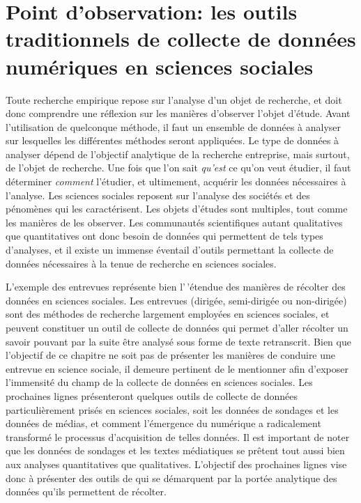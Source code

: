 \documentclass[
  letterpaper,
  DIV=11,
  numbers=noendperiod]{scrreprt}
\begin{document}
\hypertarget{point-dobservation-les-outils-traditionnels-de-collecte-de-donnuxe9es-numuxe9riques-en-sciences-sociales}{%
\section{\texorpdfstring{\textbf{Point d'observation: les outils
traditionnels de collecte de données numériques en sciences
sociales}}{Point d'observation: les outils traditionnels de collecte de données numériques en sciences sociales}}\label{point-dobservation-les-outils-traditionnels-de-collecte-de-donnuxe9es-numuxe9riques-en-sciences-sociales}}

Toute recherche empirique repose sur l'analyse d'un objet de recherche,
et doit donc comprendre une réflexion sur les manières d'observer
l'objet d'étude. Avant l'utilisation de quelconque méthode, il faut un
ensemble de données à analyser sur lesquelles les différentes méthodes
seront appliquées. Le type de données à analyser dépend de l'objectif
analytique de la recherche entreprise, mais surtout, de l'objet de
recherche. Une fois que l'on sait \emph{qu'est} ce qu'on veut étudier,
il faut déterminer \emph{comment} l'étudier, et ultimement, acquérir les
données nécessaires à l'analyse. Les sciences sociales reposent sur
l'analyse des sociétés et des pénomènes qui les caractérisent. Les
objets d'études sont multiples, tout comme les manières de les observer.
Les communautés scientifiques autant qualitatives que quantitatives ont
donc besoin de données qui permettent de tels types d'analyses, et il
existe un immense éventail d'outils permettant la collecte de données
nécessaires à la tenue de recherche en sciences sociales.

L'exemple des entrevues représente bien l'\,'étendue des manières de
récolter des données en sciences sociales. Les entrevues (dirigée,
semi-dirigée ou non-dirigée) sont des méthodes de recherche largement
employées en sciences sociales, et peuvent constituer un outil de
collecte de données qui permet d'aller récolter un savoir pouvant par la
suite être analysé sous forme de texte retranscrit. Bien que l'objectif
de ce chapitre ne soit pas de présenter les manières de conduire une
entrevue en science sociale, il demeure pertinent de le mentionner afin
d'exposer l'immensité du champ de la collecte de données en sciences
sociales. Les prochaines lignes présenteront quelques outils de collecte
de données particulièrement prisés en sciences sociales, soit les
données de sondages et les données de médias, et comment l'émergence du
numérique a radicalement transformé le processus d'acquisition de telles
données. Il est important de noter que les données de sondages et les
textes médiatiques se prêtent tout aussi bien aux analyses quantitatives
que qualitatives. L'objectif des prochaines lignes vise donc à présenter
des outils de qui se démarquent par la portée analytique des données
qu'ils permettent de récolter.
\end{document}
